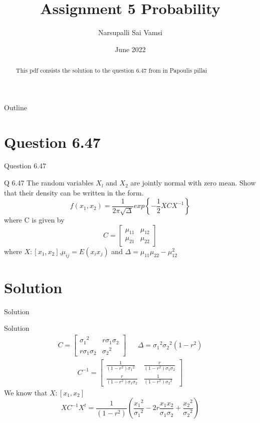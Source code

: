 \documentclass{beamer}
\title{Assignment 5 Probability}
\author{Narsupalli Sai Vamsi}
\date{June 2022}
\begin{document}
\begin{frame}
\titlepage
 \begin{abstract}
     This pdf consists the solution to the question 6.47 from in Papoulis pillai
 \end{abstract}   
\end{frame}
\begin{frame}{Outline}
\tableofcontents
\end{frame}
\section{Question 6.47}
\begin{frame}{Question 6.47}
\begin{block}{Q 6.47}
 The random variables $X_l$ and $X_2$ are jointly normal with zero mean. Show that their density can be written in the form.
 $$
 f(x_1,x_2) = \frac{1}{2\pi\sqrt{\Delta}}exp{\left\{-\frac{1}{2}XCX^{-1}\right\}}
 $$
 where C is given by $$ C =  \begin{bmatrix}
 \mu_{11} & \mu_{12} \\
 \mu_{21} & \mu_{22}
 \end{bmatrix}$$
 where $X:[x_1,x_2]$,$\mu_{ij} = E(x_ix_j)$ and $\Delta = \mu_{11}\mu_{22}- {\mu}^2_{12}$
\end{block}
\end{frame}
\section{Solution}
\begin{frame}{Solution}
\begin{block}{Solution}
\begin{align*}
 C= \begin{bmatrix}
{\sigma_1}^2 & r\sigma_1\sigma_2\\
r\sigma_1\sigma_2 & {\sigma_2}^2 
\end{bmatrix} && \Delta={\sigma_1}^2{\sigma_2}^2(1-{r}^2) 
\end{align*}
\begin{align*}
    C^{-1}= \begin{bmatrix}
    \frac{1}{(1-{r}^2){\sigma_1}^2} & \frac{r}{(1-{r}^2){\sigma_1}{\sigma_2}}\\
    \frac{r}{(1-{r}^2){\sigma_1}{\sigma_2}} & \frac{1}{(1-{r}^2){\sigma_2}^2}
    \end{bmatrix}
\end{align*}
We know that $X : [x_1,x_2]$\\
$$
XC^{-1}X^{t} = \frac{1}{(1-{r}^2)}\left(\frac{{x_1}^2}{{\sigma_1}^2} - 2r\frac{x_1x_2}{\sigma_1\sigma_2} + \frac{{x_2}^2}{{\sigma_2}^2}    \right)
$$   

\end{block}
\end{frame}
\end{document}
